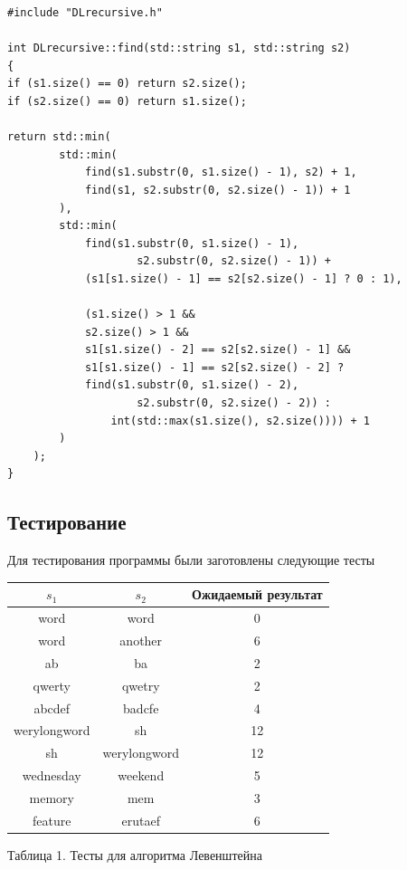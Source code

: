 \documentclass[a4paper,12pt]{article}
\begin{document}
\begin{lstlisting}[caption=Расстояние Дамерау-Левенштейна рекурсивный метод]
#include "DLrecursive.h"

int DLrecursive::find(std::string s1, std::string s2)
{
if (s1.size() == 0) return s2.size();
if (s2.size() == 0) return s1.size();

return std::min(
        std::min(
            find(s1.substr(0, s1.size() - 1), s2) + 1,
            find(s1, s2.substr(0, s2.size() - 1)) + 1
        ),
        std::min(
            find(s1.substr(0, s1.size() - 1),
                    s2.substr(0, s2.size() - 1)) +
            (s1[s1.size() - 1] == s2[s2.size() - 1] ? 0 : 1),

            (s1.size() > 1 &&
            s2.size() > 1 &&
            s1[s1.size() - 2] == s2[s2.size() - 1] &&
            s1[s1.size() - 1] == s2[s2.size() - 2] ?
            find(s1.substr(0, s1.size() - 2),
                    s2.substr(0, s2.size() - 2)) :
                int(std::max(s1.size(), s2.size()))) + 1
        )
    );
}

\end{lstlisting}

\subsection{Тестирование}

Для тестирования программы были заготовлены следующие тесты

\hfill

\begin{center}    
    \begin{tabular}{|c|c|c|}
        \hline
        $s_1$ & $s_2$ & Ожидаемый результат \\
        \hline
        word & word & 0 \\
        \hline
        word & another & 6 \\
        \hline
        ab & ba & 2 \\
        \hline
        qwerty & qwetry & 2 \\
        \hline
        abcdef & badcfe & 4 \\
        \hline
        werylongword & sh & 12 \\
        \hline
        sh & werylongword & 12 \\
        \hline
        wednesday & weekend & 5 \\
        \hline
        memory & mem & 3 \\
        \hline
        feature & erutaef & 6 \\
        \hline
    \end{tabular}
    
    Таблица 1. Тесты для алгоритма Левенштейна
\end{center}
\end{document}
